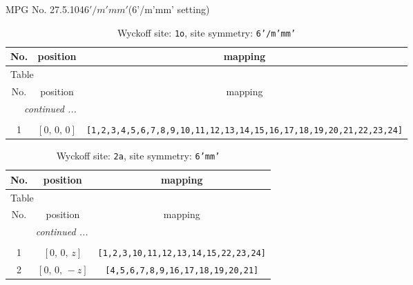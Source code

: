 \documentclass[fleqn,8pt]{jsarticle}
\begin{document}
\setcounter{MaxMatrixCols}{32}

\renewcommand{\tablename}{Table~}
\renewcommand{\figurename}{Figure~}
\begin{center}
\LARGE
MPG No. 27.5.104\quad$6'/m'mm'$\quad(6'/m'mm' setting)
\end{center}
\renewcommand{\arraystretch}{1.2}
\begin{longtable}{ccc}
\caption{Wyckoff site: {\tt 1o}, site symmetry: {\tt 6'/m'mm'}}
 \\
 \hline \hline
No. & position & mapping \\ \hline \endfirsthead

\multicolumn{2}{l}{\tablename\ \thetable{}} \\
 \hline \hline
No. & position & mapping \\ \hline \endhead

 \hline \hline
\multicolumn{2}{r}{\footnotesize\it continued ...} \\ \endfoot

 \hline \hline
\multicolumn{2}{r}{} \\ \endlastfoot

1 & $\left[ 0,\, 0,\, 0 \right]$ & {\tt [1,2,3,4,5,6,7,8,9,10,11,12,13,14,15,16,17,18,19,20,21,22,23,24]} \\
\end{longtable}
\renewcommand{\arraystretch}{1.2}
\begin{longtable}{ccc}
\caption{Wyckoff site: {\tt 2a}, site symmetry: {\tt 6'mm'}}
 \\
 \hline \hline
No. & position & mapping \\ \hline \endfirsthead

\multicolumn{2}{l}{\tablename\ \thetable{}} \\
 \hline \hline
No. & position & mapping \\ \hline \endhead

 \hline \hline
\multicolumn{2}{r}{\footnotesize\it continued ...} \\ \endfoot

 \hline \hline
\multicolumn{2}{r}{} \\ \endlastfoot

1 & $\left[ 0,\, 0,\, z \right]$ & {\tt [1,2,3,10,11,12,13,14,15,22,23,24]} \\ \hline
2 & $\left[ 0,\, 0,\, - z \right]$ & {\tt [4,5,6,7,8,9,16,17,18,19,20,21]} \\
\end{longtable}
\renewcommand{\arraystretch}{1.2}
\end{document}
